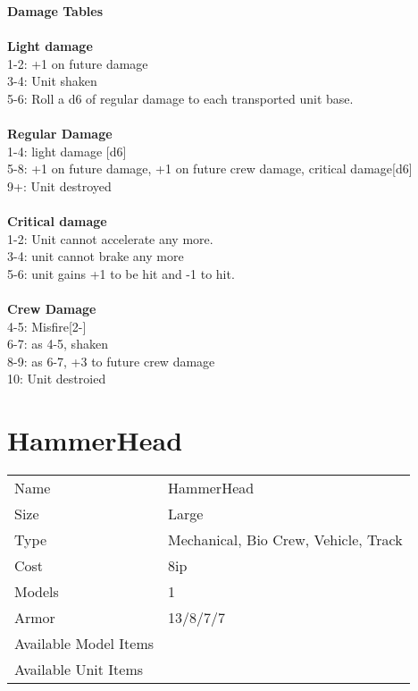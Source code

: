 {\bf Damage Tables} \\
\ \\ {\bf Light damage } \\
1-2: +1 on future damage \\
3-4: Unit shaken \\
5-6: Roll a d6 of regular damage to each transported unit base. \\
\ \\ {\bf Regular Damage } \\
1-4: light damage [d6] \\
5-8: +1 on future damage, +1 on future crew damage, critical damage[d6] \\
9+: Unit destroyed \\
\ \\ {\bf Critical damage } \\
1-2: Unit cannot accelerate any more.  \\
3-4: unit cannot brake any more \\
5-6: unit gains +1 to be hit and -1 to hit. \\
\ \\ {\bf Crew Damage } \\
4-5: Misfire[2-] \\
6-7: as 4-5, shaken \\
8-9: as 6-7, +3 to future crew damage \\
10: Unit destroied \\









\pagebreak

\section{ HammerHead }

\begin{tabular}{ll}
  Name & HammerHead \\
  Size & Large\\
  Type & Mechanical, Bio Crew, Vehicle, Track\\
  Cost & 8ip\\
  Models & 1\\
  Armor & 13/8/7/7\\
  Available Model Items &  \\
  Available Unit Items &  \\
\end{tabular}

